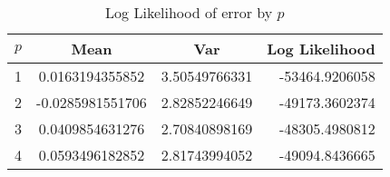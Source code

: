 \documentclass[11pt]{article}
\begin{document}
\begin{enumerate}
\begin{table}[!th]
\centering
\begin{tabular}{| l| c | c | r|}
\hline
$p$ & Mean & Var & Log Likelihood \\
\hline
1 & 0.0163194355852 & 3.50549766331 & -53464.9206058 \\
2 & -0.0285981551706 & 2.82852246649 & -49173.3602374 \\
3 & 0.0409854631276 & 2.70840898169 & -48305.4980812 \\
4 & 0.0593496182852 & 2.81743994052 & -49094.8436665 \\
\hline
\end{tabular}
\caption{Log Likelihood of error by $p$}
\label{ex:table}
\end{table}

\end{enumerate}
\end{document}

